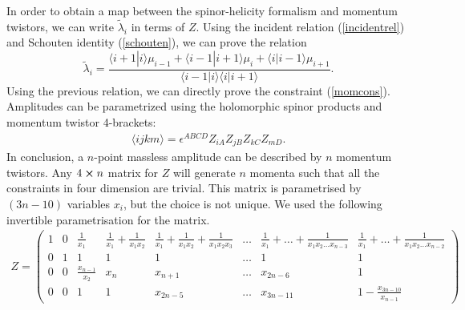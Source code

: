 In order to obtain a map between the spinor-helicity formalism and momentum twistors, we can write $\tilde \lambda_i$ in terms of $Z$. Using the incident relation (\ref{incidentrel}) and Schouten identity (\ref{schouten}), we can prove the relation
$$
	\tilde\lambda_i=\frac{\langle i+1|i\rangle\mu_{i-1}+\langle i-1|i+1\rangle\mu_i+\langle i | i-1 \rangle\mu_{i+1}}{\langle i-1 | i \rangle \langle i | i+1 \rangle}.
$$
Using the previous relation, we can directly prove the constraint (\ref{momcons}).
Amplitudes can be parametrized using the holomorphic spinor products and momentum twistor 4-brackets:
\begin{align*}
	\langle ijkm \rangle= \epsilon^{ABCD}Z_{iA}Z_{jB}Z_{kC}Z_{mD}.
\end{align*}
In conclusion, a $n$-point massless amplitude can be described by $n$ momentum twistors. Any $4\cross n$ matrix for $Z$ will generate $n$ momenta such that all the constraints in four dimension are trivial. This matrix is parametrised by $(3n-10)$ variables $x_i$, but the choice is not unique. We used the following invertible parametrisation for the matrix.
\begin{align}
	Z=\begin{pmatrix}
		1 & 0 & \frac{1}{x_1} & \frac{1}{x_1}+\frac{1}{x_1x_2} & \frac{1}{x_1}+\frac{1}{x_1x_2}+\frac{1}{x_1x_2x_3}&  \dots&\frac{1}{x_1}+\dots+\frac{1}{x_1x_2\dots x_{n-3}} &\frac{1}{x_1}+\dots+\frac{1}{x_1x_2\dots x_{n-2}} \\
		0 & 1 & 1 & 1 & 1 &\dots& 1 &1\\
		0 & 0 & \frac{x_{n-1}}{x_{2}} & x_{n} & x_{n+1}& \dots  & x_{2n-6} & 1\\
		0 & 0 & 1 & 1 & x_{2n-5} & \dots  & x_{3n-11} & 1-\frac{x_{3n-10}}{x_{n-1}}
	\end{pmatrix}
	\label{momparamet}
\end{align}
